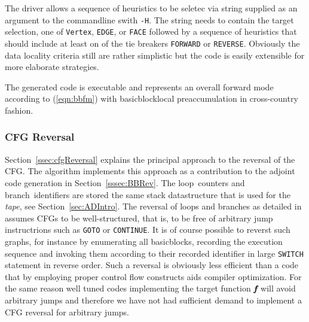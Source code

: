 \documentclass[acmtocl,acmnow]{acmtrans2m}
\newcommand{\Loop}{loop}
\newcommand{\branch}{branch}
\newcommand{\basicblock}{basicblock}
\newcommand{\bmf}{\mbox{\bf\em f}}
\newcommand{\code}[1]{{\small\tt{#1}}}
\newcommand{\refeqn}[1]{(\ref{#1})}
\newcommand{\refsec}[1]{Section~\ref{#1}}
\begin{document}
The driver allows a sequence of heuristics to be seletec via string supplied as 
an argument to the commandline swith \code{-H}. The string needs to contain 
the target selection, one of \code{Vertex}, \code{EDGE}, or \code{FACE} followed by 
a sequence of heuristics that should include at least on of the tie breakers \code{FORWARD} or 
\code{REVERSE}. 
Obviously the data locality criteria still are rather simplistic but 
the code is easily extensible for more elaborate strategies. 

The generated code is executable and represents an overall forward mode 
according to \refeqn{eqn:bbfm} with \basicblock\-local preaccumulation in 
cross-country fashion. 

\subsubsection{CFG Reversal}\label{sssec:cfgRevAlg}

\refsec{ssec:cfgReversal} explains the principal approach to the reversal 
of the CFG. The algorithm implements this approach as a contribution to the 
adjoint code generation in \refsec{sssec:BBRev}. 
The \Loop\ counters and \branch\ identifiers are stored the same 
stack datastructure that is used for the {\em tape}, see \refsec{sec:ADIntro}.  
The reversal of loops and branches as detailed in \cite{NULF04CFR} assumes 
CFGs to be well-structured, that is, to be free of arbitrary jump instructrions 
such as \code{GOTO} or \code{CONTINUE}. 
It is of course possible to reverst such graphs, for instance by enumerating
all {\basicblock}s, recording the execution sequence and invoking them according 
to their recorded identifier in  large  \code {SWITCH} statement in reverse order.
Such a reversal is obviously less efficient than a code that by employing proper 
control flow constructs aids compiler optimization. 
For the same reason well tuned codes implementing the target function $\bmf$ will 
avoid arbitrary jumps and therefore we have not had sufficient demand to implement 
a CFG reversal for arbitrary jumps. 
\end{document}
